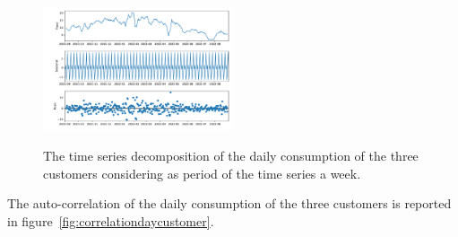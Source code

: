 \begin{figure}[H]
\begin{minipage}[b]{17cm}
\centering
\includegraphics[width=0.5\textwidth]{images/baseline/daily_aggregated_decomposition_customer3}
\label{fig:decompositiondaycustomer3}
\end{minipage}
\label{fig:decompositiondaycustomer}
\caption{The time series decomposition of the daily consumption of the three customers considering as period of the time series a week.}
\end{figure}

The auto-correlation of the daily consumption of the three customers is reported in figure~\ref{fig:correlationdaycustomer}. %

